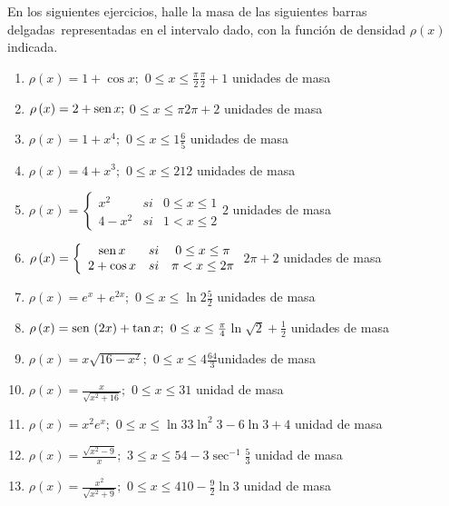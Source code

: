 \begin{ejer}{En los siguientes ejercicios, halle la masa de las siguientes barras
delgadas\ representadas en el intervalo dado, con la función de densidad
$\rho \left( x\right) $ indicada.}
\end{ejer}

{\small
\begin{enumerate}
	
\item { $\rho \left( x\right) =1+\cos x;$ $0\leq x\leq \frac{\pi }{2}$}{$\frac{\pi }{2}+1$ unidades de masa}

\item {$\rho \left( x\right) =2+\text{\rm sen}\, x;$ $0\leq x\leq \pi $}{$2\pi +2$ unidades de masa}

\item {$\rho \left( x\right) =1+x^{4};$ $0\leq x\leq 1$}{$\frac{6}{5}$ unidades de masa}

\item {$\rho \left( x\right) =4+x^{3};$ $0\leq x\leq 2$}{$12$ unidades de masa}

\item {$\rho \left( x\right) =\left\{
\begin{array}{ccc}
x^{2} & si & 0\leq x\leq 1 \\
4-x^{2} & si & 1< x\leq 2%
\end{array}%
\right. $}{$2$ unidades de masa}

\item {$\rho \left( x\right) =\left\{
\begin{array}{ccc}
\sen x & si & 0\leq x\leq \pi \\
2+\cos x & si & \pi < x\leq 2\pi%
\end{array}%
\right. $}{$2\pi +2$ unidades de masa}

\item {$\rho \left( x\right) =e^{x}+e^{2x};$ $0\leq x\leq \ln 2$}{$\frac{5}{2}$ unidades de masa}

\item {$\rho \left( x\right) =\text{\rm sen}\, \left( 2x\right) +\tan x;$ $0\leq x\leq \frac{%
\pi }{4}$}{$\ln \sqrt{2}+\frac{1}{2}$ unidades de masa}

\item {$\rho \left( x\right) =x\sqrt{16-x^{2}};$ $0\leq x\leq 4$}{$\frac{64}{3}$unidades de masa}

\item {$\rho \left( x\right) =\frac{x}{\sqrt{x^{2}+16}};$ $0\leq x\leq 3$}{$1$ unidad de masa}

\item {$\rho \left( x\right) =x^{2}e^{x};$ $0\leq x\leq \ln 3$}{$3\ln^2{3}-6\ln 3+4$ unidad de masa}

\item {$\rho \left( x\right) =\frac{\sqrt{x^{2}-9}}{x};$ $3\leq x\leq 5$}{$4-3\sec^{-1}\frac{5}{3}$ unidad de masa}

\item {$\rho \left( x\right) =\frac{x^{2}}{\sqrt{x^{2}+9}};$ $0\leq x\leq 4$}{$10-\frac{9}{2}\ln 3$ unidad de masa}
\end{enumerate}
}

